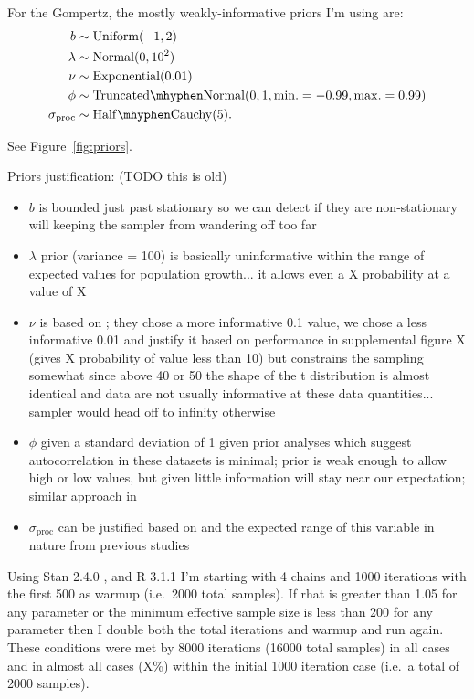 \documentclass[11pt]{article}
\begin{document}
For the Gompertz, the mostly weakly-informative priors I'm using are:
\begin{align*}
b &\sim \mathrm{Uniform}(-1, 2)\\
\lambda &\sim \mathrm{Normal}(0, 10^2)\\
\nu &\sim \mathrm{Exponential}(0.01)\\
\phi &\sim \mathrm{Truncated\mhyphen Normal}(0, 1, \mathrm{min.} = -0.99, \mathrm{max.} = 0.99)\\
\sigma_\mathrm{proc} &\sim \mathrm{Half\mhyphen Cauchy} (5).
\end{align*}

See Figure~\ref{fig:priors}.

Priors justification: (TODO this is old)

\begin{itemize}
\item $b$ is bounded just past stationary so we can detect if they are non-stationary will keeping the sampler from wandering off too far

\item $\lambda$ prior (variance = 100) is basically uninformative within the range of expected values for population growth... it allows even a X probability at a value of X

\item $\nu$ is based on \citet{fernandez1998}; they chose a more informative 0.1 value, we chose a less informative 0.01 and justify it based on performance in supplemental figure X (gives X probability of value less than 10) but constrains the sampling somewhat since above 40 or 50 the shape of the t distribution is almost identical and data are not usually informative at these data quantities... sampler would head off to infinity otherwise

\item $\phi$ given a standard deviation of 1 given prior analyses which suggest autocorrelation in these datasets is minimal; prior is weak enough to allow high or low values, but given little information will stay near our expectation; similar approach in \citep{thorson2014a}

\item $\sigma_\mathrm{proc}$ can be justified based on \citet{gelman2006c} and the expected range of this variable in nature from previous studies \citep[e.g.][]{connors2014}
\end{itemize}

Using Stan 2.4.0 \citep{stan-manual2014}, and R 3.1.1 \citep{r2014} I'm starting with 4 chains and 1000 iterations with the first 500 as warmup (i.e.\ 2000 total samples). If rhat is greater than 1.05 for any parameter or the minimum effective sample size is less than 200 for any parameter then I double both the total iterations and warmup and run again. These conditions were met by 8000 iterations (16000 total samples) in all cases and in almost all cases (X\%) within the initial 1000 iteration case (i.e.\ a total of 2000 samples).
\end{document}
